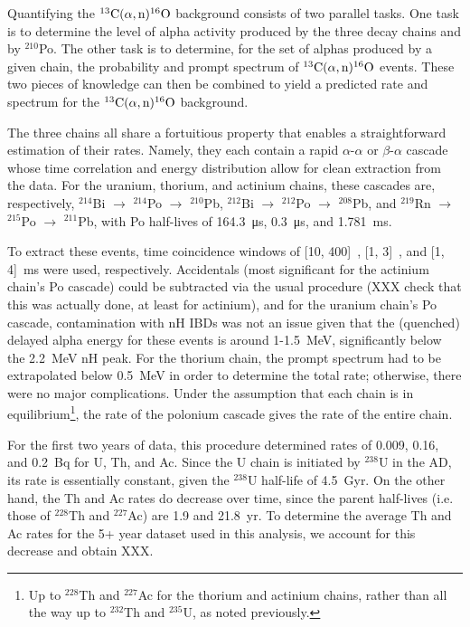 \documentclass[../thesis.tex]{subfiles}
\begin{document}
Quantifying the $^{13}\mathrm{C}(\alpha, \mathrm{n})^{16}\mathrm{O}$ background consists of two parallel tasks. One task is
to determine the level of alpha activity produced by the three decay chains and
by $^{210}$Po. The other task is to determine, for the set of alphas produced by
a given chain, the probability and prompt spectrum of $^{13}\mathrm{C}(\alpha, \mathrm{n})^{16}\mathrm{O}$ events. These two
pieces of knowledge can then be combined to yield a predicted rate and spectrum
for the $^{13}\mathrm{C}(\alpha, \mathrm{n})^{16}\mathrm{O}$ background.

The three chains all share a fortuitious property that enables a straightforward
estimation of their rates. Namely, they each contain a rapid $\alpha$-$\alpha$
or $\beta$-$\alpha$ cascade whose time correlation and energy distribution allow
for clean extraction from the data. For the uranium, thorium, and actinium
chains, these cascades are, respectively, $^{214}$Bi $\to$ $^{214}$Po $\to$
$^{210}$Pb, $^{212}$Bi $\to$ $^{212}$Po $\to$ $^{208}$Pb, and $^{219}$Rn $\to$
$^{215}$Po $\to$ $^{211}$Pb, with Po half-lives of \SI{164.3}{\micro s},
\SI{0.3}{\micro s}, and \SI{1.781}{ms}.

To extract these events, time coincidence windows of [10, 400]~\us, [1, 3]~\us,
and [1, 4]~ms were used, respectively. Accidentals (most significant for the
actinium chain's Po cascade) could be subtracted via the usual procedure (XXX
check that this was actually done, at least for actinium), and for the uranium
chain's Po cascade, contamination with nH IBDs was not an issue given that the
(quenched) delayed alpha energy for these events is around 1-1.5~MeV,
significantly below the 2.2~MeV nH peak. For the thorium chain, the prompt
spectrum had to be extrapolated below 0.5~MeV in order to determine the total
rate; otherwise, there were no major complications. Under the assumption that
each chain is in equilibrium\footnote{Up to $^{228}$Th and $^{227}$Ac for the
  thorium and actinium chains, rather than all the way up to $^{232}$Th and
  $^{235}$U, as noted previously.}, the rate of the polonium cascade gives the
rate of the entire chain.

For the first two years of data, this procedure determined rates of 0.009, 0.16,
and 0.2~Bq for U, Th, and Ac. Since the U chain is initiated by $^{238}$U in the
AD, its rate is essentially constant, given the $^{238}$U half-life of
4.5~Gyr. On the other hand, the Th and Ac rates do decrease over time, since the
parent half-lives (i.e. those of $^{228}$Th and $^{227}$Ac) are 1.9 and
21.8~yr. To determine the average Th and Ac rates for the 5+ year dataset used
in this analysis, we account for this decrease and obtain XXX.
\end{document}
